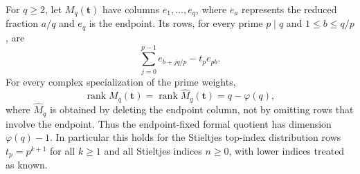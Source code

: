 \begin{theorem}
\label{tower:thm:rank}
For $q\ge2$, let $M_q(\mathbf t)$ have columns $e_1,\ldots,e_q$,
where $e_a$ represents the reduced fraction $a/q$ and $e_q$ is the endpoint.
Its rows, for every prime $p\mid q$ and $1\le b\le q/p$, are
\[
 \sum_{j=0}^{p-1}e_{b+jq/p}-t_p e_{pb}.
\]
For every complex specialization of the prime weights,
\[
 \operatorname{rank}M_q(\mathbf t)
 =\operatorname{rank}\widehat M_q(\mathbf t)=q-\varphi(q),
\]
where $\widehat M_q$ is obtained by deleting the endpoint column, not
by omitting rows that involve the endpoint. Thus the endpoint-fixed
formal quotient has dimension $\varphi(q)-1$.
In particular this holds for the Stieltjes top-index distribution rows
$t_p=p^{k+1}$ for all $k\ge1$ and all Stieltjes indices $n\ge0$,
with lower indices treated as known.
\end{theorem}
